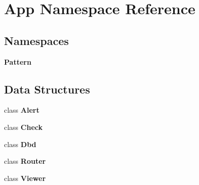 \section{App Namespace Reference}
\label{namespace_app}
\subsection*{Namespaces}
\begin{DoxyCompactItemize}
\item 
 \textbf{ Pattern}
\end{DoxyCompactItemize}
\subsection*{Data Structures}
\begin{DoxyCompactItemize}
\item 
class \textbf{ Alert}
\item 
class \textbf{ Check}
\item 
class \textbf{ Dbd}
\item 
class \textbf{ Router}
\item 
class \textbf{ Viewer}
\end{DoxyCompactItemize}
